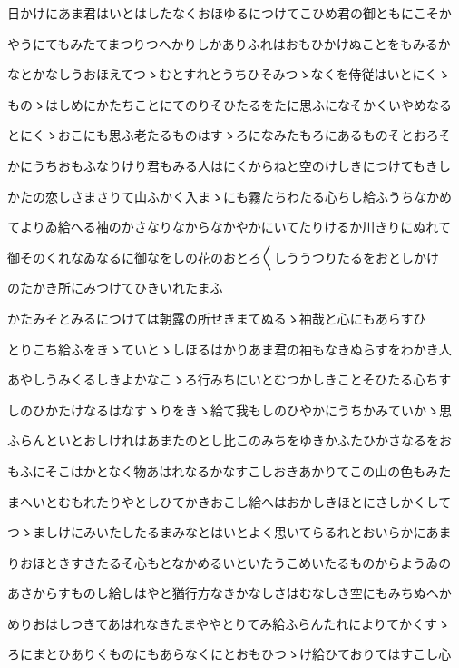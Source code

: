 \documentclass[a4paper,11pt,landscape]{ltjtarticle}
\begin{document}
日かけにあま君はいとはしたなくおほゆるにつけてこひめ君の御ともにこそか
\par\medskip
やうにてもみたてまつりつへかりしかありふれはおもひかけぬことをもみるか
\par\medskip
なとかなしうおほえてつゝむとすれとうちひそみつゝなくを侍従はいとにくゝ
\par\medskip
ものゝはしめにかたちことにてのりそひたるをたに思ふになそかくいやめなる
\par\medskip
とにくゝおこにも思ふ老たるものはすゝろになみたもろにあるものそとおろそ
\par\medskip
かにうちおもふなりけり君もみる人はにくからねと空のけしきにつけてもきし
\par\medskip
かたの恋しさまさりて山ふかく入まゝにも霧たちわたる心ちし給ふうちなかめ
\par\medskip
てよりゐ給へる袖のかさなりなからなかやかにいてたりけるか川きりにぬれて
\par\medskip
御そのくれなゐなるに御なをしの花のおとろ〱しううつりたるをおとしかけ
\par\medskip
のたかき所にみつけてひきいれたまふ
\par\medskip
かたみそとみるにつけては朝露の所せきまてぬるゝ袖哉と心にもあらすひ
\par\medskip
とりこち給ふをきゝていとゝしほるはかりあま君の袖もなきぬらすをわかき人
\par\medskip
あやしうみくるしきよかなこゝろ行みちにいとむつかしきことそひたる心ちす
\par\medskip
しのひかたけなるはなすゝりをきゝ給て我もしのひやかにうちかみていかゝ思
\par\medskip
ふらんといとおしけれはあまたのとし比このみちをゆきかふたひかさなるをお
\par\medskip
もふにそこはかとなく物あはれなるかなすこしおきあかりてこの山の色もみた
\par\medskip
まへいとむもれたりやとしひてかきおこし給へはおかしきほとにさしかくして
\par\medskip
つゝましけにみいたしたるまみなとはいとよく思いてらるれとおいらかにあま
\par\medskip
りおほときすきたるそ心もとなかめるいといたうこめいたるものからようゐの
\par\medskip
あさからすものし給しはやと猶行方なきかなしさはむなしき空にもみちぬへか
\par\medskip
めりおはしつきてあはれなきたまややとりてみ給ふらんたれによりてかくすゝ
\par\medskip
ろにまとひありくものにもあらなくにとおもひつゝけ給ひておりてはすこし心
\end{document}
